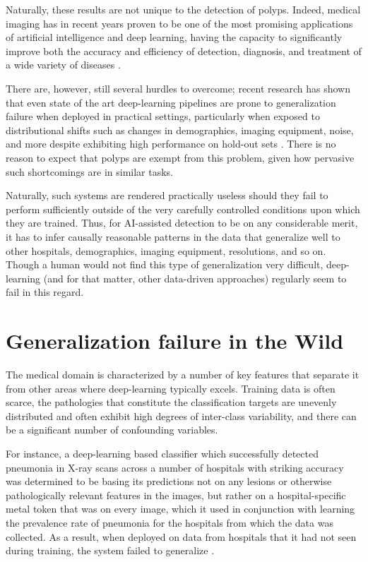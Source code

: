 	Naturally, these results are not unique to the detection of polyps. Indeed, medical imaging has in recent years proven to be one of the most promising applications of artificial intelligence and deep learning, having the capacity to significantly improve both the accuracy and efficiency of detection, diagnosis, and treatment of a wide variety of diseases \cite{dl_medical_imaging}. 
	
	
	There are, however, still several hurdles to overcome; recent research has shown that even state of the art deep-learning pipelines are prone to generalization failure when deployed in practical settings, particularly when exposed to distributional shifts such as changes in demographics, imaging equipment, noise, and more despite exhibiting high performance on hold-out sets \cite{retinopathy, damour2020underspecification}. There is no reason to expect that polyps are exempt from this problem, given how pervasive such shortcomings are in similar tasks.
	
	Naturally, such systems are rendered practically useless should they fail to perform sufficiently outside of the very carefully controlled conditions upon which they are trained. Thus, for AI-assisted detection to be on any considerable merit, it has to infer causally reasonable patterns in the data that generalize well to other hospitals, demographics, imaging equipment, resolutions, and so on. Though a human would not find this type of generalization very difficult, deep-learning (and for that matter, other data-driven approaches) regularly seem to fail in this regard. 

\section{Generalization failure in the Wild}

	The medical domain is characterized by a number of key features that separate it from other areas where deep-learning typically excels. Training data is often scarce, the pathologies that constitute the classification targets are unevenly distributed and often exhibit high degrees of inter-class variability, and there can be a significant number of confounding variables. 
		
	For instance, a deep-learning based classifier which successfully detected pneumonia in X-ray scans across a number of hospitals with striking accuracy was determined to be basing its predictions not on any lesions or otherwise pathologically relevant features in the images, but rather on a hospital-specific metal token that was on every image, which it used in conjunction with learning the prevalence rate of pneumonia for the hospitals from which the data was collected. As a result, when deployed on data from hospitals that it had not seen during training, the system failed to generalize \cite{pneumonia}. 
		
